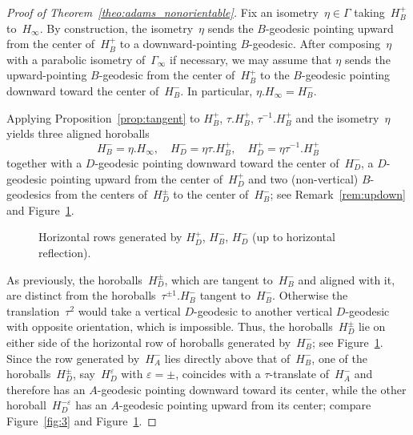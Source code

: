 \documentclass[11pt,reqno]{amsart}
\theoremstyle{definition}
\numberwithin{equation}{section}
\numberwithin{equation}{section}
\begin{document}
\begin{proof}[Proof of Theorem~\ref{theo:adams_nonorientable}]
Fix an isometry~$\eta \in \Gamma$ taking~$H_B^+$ to~$H_\infty$.
By construction, the isometry~$\eta$ sends the $B$-geodesic pointing upward from the center of~$H_B^+$ to a downward-pointing $B$-geodesic.
After composing~$\eta$ with a parabolic isometry of~$\Gamma_\infty$ if necessary, we may assume that $\eta$ sends the upward-pointing $B$-geodesic from the center of~$H_B^+$ to the $B$-geodesic pointing downward toward the center of~$H_B^-$.
In particular, $\eta.H_\infty=H_B^-$.

\medskip


Applying Proposition~\ref{prop:tangent} to $H_B^+$, $\tau.H_B^+$, $\tau^{-1}.H_B^+$  and the isometry~$\eta$ yields three aligned horoballs 
\[
H_B^-=\eta.H_\infty, \quad H_D^-=\eta \tau.H_B^+, \quad H_D^+= \eta \tau^{-1}.H_B^+
\] 
together with a $D$-geodesic pointing downward toward the center of~$H_D^-$, a $D$-geodesic pointing upward from the center of~$H_D^+$ and two (non-vertical) $B$-geodesics from the centers of~$H_D^{\pm }$ to the center of~$H_B^-$; see Remark~\ref{rem:updown} and Figure~\ref{fig:4}. 

\medskip

\begin{figure}[htbp!]
\centering
\vspace*{1cm}
\hspace*{-4,2cm}
\def\svgwidth{0.4\textheight}

\vspace*{0.4cm}
\caption{Horizontal rows generated by $H_D^+$, $H_B^-$, $H_D^-$ (up to horizontal reflection).} \label{fig:4}
\end{figure}


As previously, the horoballs~$H_D^\pm$, which are tangent to~$H_B^-$ and aligned with it, are distinct from the horoballs~$\tau^{\pm 1}.H_B^-$ tangent to~$H_B^-$.
Otherwise the translation~$\tau^2$ would take a vertical $D$-geodesic to another vertical $D$-geodesic with opposite orientation, which is impossible.
Thus, the horoballs~$H_D^\pm$ lie on either side of the horizontal row of horoballs generated by~$H_B^-$; see Figure~\ref{fig:4}. 
Since the row generated by~$H_A^-$ lies directly above that of~$H_B^-$, one of the horoballs~$H_D^{\pm}$, say~$H_D^\varepsilon$ with $\varepsilon=\pm$, coincides with a $\tau$-translate of~$H_A^-$ and therefore has an $A$-geodesic pointing downward toward its center, while the other horoball~$H_D^{-\varepsilon}$ has an $A$-geodesic pointing upward from its center; compare Figure~\ref{fig:3} and Figure~\ref{fig:4}.


\end{proof}
\end{document}
